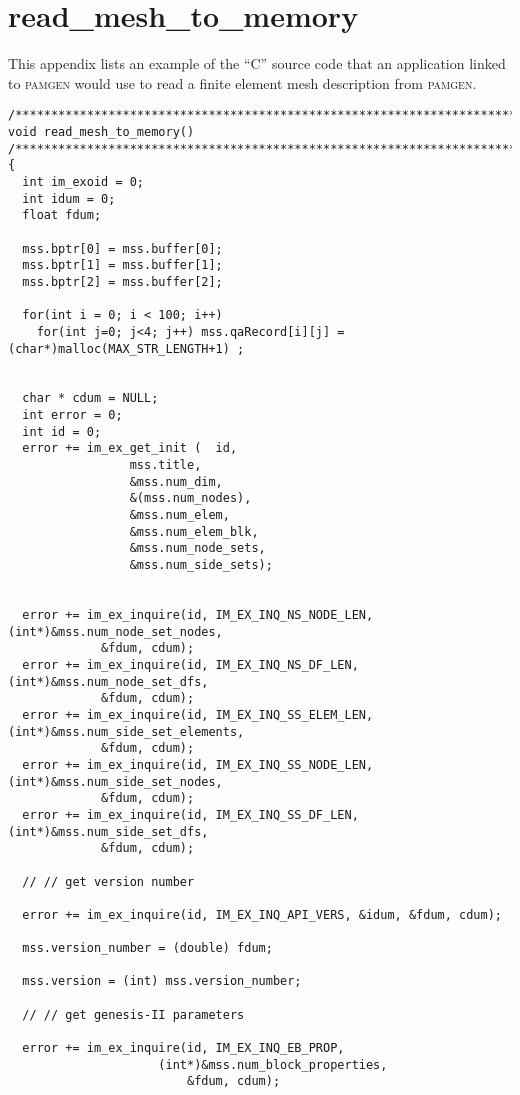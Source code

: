\section{read\_mesh\_to\_memory}
This appendix lists an example of the ``C'' source code that an application linked to \textsc{pamgen}
would use to read a finite element mesh description from \textsc{pamgen}.
\label{sec:read-mesh-to-memory}

\begin{Verbatim}[fontsize=\small] 
/*****************************************************************************/
void read_mesh_to_memory()
/*****************************************************************************/
{
  int im_exoid = 0;
  int idum = 0;
  float fdum;

  mss.bptr[0] = mss.buffer[0];      
  mss.bptr[1] = mss.buffer[1];      
  mss.bptr[2] = mss.buffer[2];      
  
  for(int i = 0; i < 100; i++)
    for(int j=0; j<4; j++) mss.qaRecord[i][j] = (char*)malloc(MAX_STR_LENGTH+1) ;
  
  
  char * cdum = NULL;
  int error = 0;
  int id = 0;
  error += im_ex_get_init (  id,
			     mss.title,
			     &mss.num_dim,
			     &(mss.num_nodes),
			     &mss.num_elem, 
			     &mss.num_elem_blk,
			     &mss.num_node_sets,
			     &mss.num_side_sets);
  
  
  error += im_ex_inquire(id, IM_EX_INQ_NS_NODE_LEN, (int*)&mss.num_node_set_nodes, 
			 &fdum, cdum);
  error += im_ex_inquire(id, IM_EX_INQ_NS_DF_LEN,   (int*)&mss.num_node_set_dfs, 
			 &fdum, cdum);
  error += im_ex_inquire(id, IM_EX_INQ_SS_ELEM_LEN, (int*)&mss.num_side_set_elements,
			 &fdum, cdum);
  error += im_ex_inquire(id, IM_EX_INQ_SS_NODE_LEN, (int*)&mss.num_side_set_nodes,
			 &fdum, cdum);
  error += im_ex_inquire(id, IM_EX_INQ_SS_DF_LEN,   (int*)&mss.num_side_set_dfs, 
			 &fdum, cdum);
    
  // // get version number
    
  error += im_ex_inquire(id, IM_EX_INQ_API_VERS, &idum, &fdum, cdum);
    
  mss.version_number = (double) fdum;
    
  mss.version = (int) mss.version_number;
    
  // // get genesis-II parameters
    
  error += im_ex_inquire(id, IM_EX_INQ_EB_PROP, 
	                 (int*)&mss.num_block_properties, 
                         &fdum, cdum);
    

\end{Verbatim}
